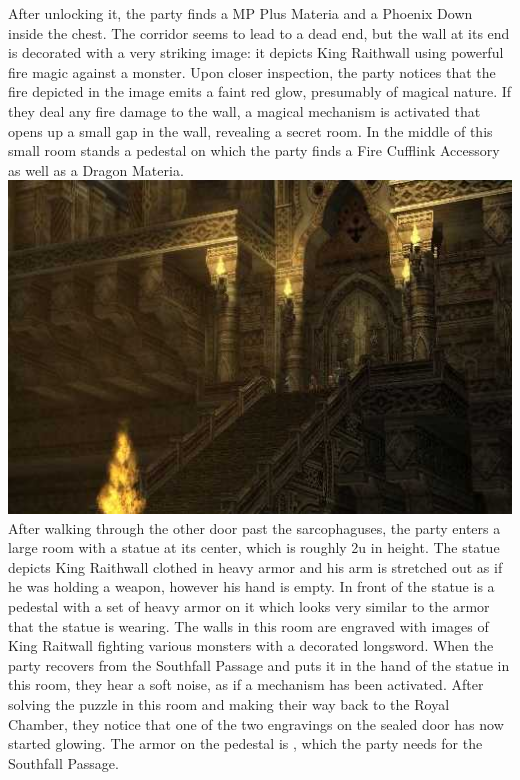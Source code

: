After unlocking it, the party finds a MP Plus Materia and a Phoenix Down inside the chest.
The corridor seems to lead to a dead end, but the wall at its end is decorated with a very striking image: it depicts King Raithwall using powerful fire magic against a monster.
Upon closer inspection, the party notices that the fire depicted in the image emits a faint red glow, presumably of magical nature.
If they deal any fire damage to the wall, a magical mechanism is activated that opens up a small gap in the wall, revealing a secret room.
In the middle of this small room stands a pedestal on which the party finds a Fire Cufflink Accessory as well as a Dragon Materia.
%
\vfill
%
\includegraphics[width=\columnwidth]{./art/tombofraithwall/tomb5.jpg}
%
\vfill
%
After walking through the other door past the sarcophaguses, the party enters a large room with a statue at its center, which is roughly 2u in height.
The statue depicts King Raithwall clothed in heavy armor and his arm is stretched out as if he was holding a weapon, however his hand is empty.
In front of the statue is a pedestal with a set of heavy armor on it which looks very similar to the armor that the statue is wearing.
The walls in this room are engraved with images of King Raitwall fighting various monsters with a decorated longsword.
When the party recovers  from the Southfall Passage and puts it in the hand of the statue in this room, they hear a soft noise, as if a mechanism has been activated.
After solving the puzzle in this room and making their way back to the Royal Chamber, they notice that one of the two engravings on the sealed door has now started glowing.
The armor on the pedestal is , which the party needs for the Southfall Passage.
